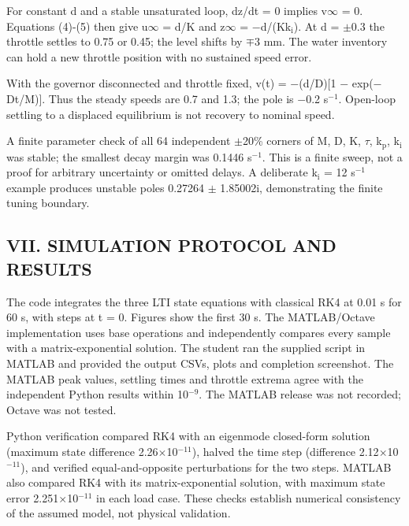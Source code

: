 \documentclass[conference]{IEEEtran}
\begin{document}
For constant d and a stable unsaturated loop, dz/dt = 0 implies v\ensuremath{\infty} = 0. Equations (4)-(5) then give u\ensuremath{\infty} = d/K and z\ensuremath{\infty} = \ensuremath{-}d/(Kk\ensuremath{_{\mathrm{i}}}). At d = \ensuremath{\pm}0.3 the throttle settles to 0.75 or 0.45; the level shifts by \ensuremath{\mp}3 mm. The water inventory can hold a new throttle position with no sustained speed error.

With the governor disconnected and throttle fixed, v(t) = \ensuremath{-}(d/D)[1 \ensuremath{-} exp(\ensuremath{-}Dt/M)]. Thus the steady speeds are 0.7 and 1.3; the pole is \ensuremath{-}0.2 s\ensuremath{{}^{-1}}. Open-loop settling to a displaced equilibrium is not recovery to nominal speed.

A finite parameter check of all 64 independent \ensuremath{\pm}20\% corners of M, D, K, \ensuremath{\tau}, k\ensuremath{_{\mathrm{p}}}, k\ensuremath{_{\mathrm{i}}} was stable; the smallest decay margin was 0.1446 s\ensuremath{{}^{-1}}. This is a finite sweep, not a proof for arbitrary uncertainty or omitted delays. A deliberate k\ensuremath{_{\mathrm{i}}} = 12 s\ensuremath{{}^{-1}} example produces unstable poles 0.27264 \ensuremath{\pm} 1.85002i, demonstrating the finite tuning boundary.

\subsection*{VII. SIMULATION PROTOCOL AND RESULTS}
The code integrates the three LTI state equations with classical RK4 at 0.01 s for 60 s, with steps at t = 0. Figures show the first 30 s. The MATLAB/Octave implementation uses base operations and independently compares every sample with a matrix-exponential solution. The student ran the supplied script in MATLAB and provided the output CSVs, plots and completion screenshot. The MATLAB peak values, settling times and throttle extrema agree with the independent Python results within 10\ensuremath{{}^{-9}}. The MATLAB release was not recorded; Octave was not tested.

Python verification compared RK4 with an eigenmode closed-form solution (maximum state difference 2.26\ensuremath{\times}10\ensuremath{{}^{-11}}), halved the time step (difference 2.12\ensuremath{\times}10\ensuremath{{}^{-11}}), and verified equal-and-opposite perturbations for the two steps. MATLAB also compared RK4 with its matrix-exponential solution, with maximum state error 2.251\ensuremath{\times}10\ensuremath{{}^{-11}} in each load case. These checks establish numerical consistency of the assumed model, not physical validation.
\end{document}
